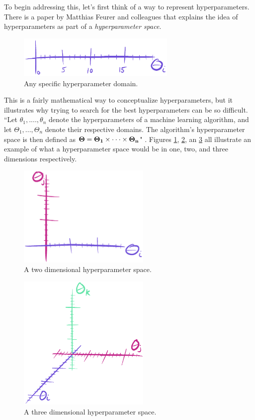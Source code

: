 \documentclass[12pt]{report}
\begin{document}
To begin addressing this, let's first think of a way to represent hyperparameters. There is a paper by Matthias Feurer and colleagues that explains the idea of hyperparameters as part of a \emph{hyperparameter space}.
\begin{figure}[hbt!]
    \centering
    \includegraphics[width=3in]{figures/plot-1d.PNG}
    \caption{Any specific hyperparameter domain.}
    \label{plot-1d}
\end{figure}
This is a fairly mathematical way to conceptualize hyperparameters, but it illustrates why trying to search for the best hyperparameters can be so difficult. ``Let $\theta_1, ...., \theta_n$ denote the hyperparameters of a machine learning algorithm, and let $\Theta_1,..., \Theta_n$ denote their respective domains. The algorithm's hyperparameter space is then defined as $\bf{\Theta} = \Theta_1 \times \cdot \cdot \cdot \times \Theta_n$" \cite{feurer2015initializing}. Figures \ref{plot-1d}, \ref{plot-2d}, an \ref{plot-3d} all illustrate an example of what a hyperparameter space would be in one, two, and three dimensions respectively.
\begin{figure}[hbt!]
    \centering
    \includegraphics[width=2.5in]{figures/plot-2d.PNG}
    \caption{A two dimensional hyperparameter space.}
    \label{plot-2d}
\end{figure}

\begin{figure}[hbt!]
    \centering
    \includegraphics[width=2.5in]{figures/plot-3d.PNG}
    \caption{A three dimensional hyperparameter space.}
    \label{plot-3d}
\end{figure}
\end{document}
